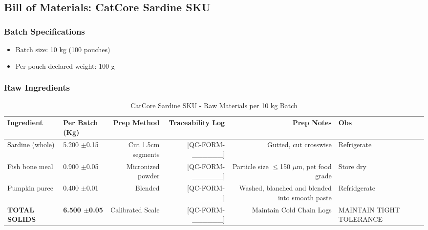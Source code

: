 \subsection*{Bill of Materials: CatCore Sardine SKU}
\label{bom:catcore_heart}

\subsubsection*{Batch Specifications}
\begin{itemize}
\item Batch size: 10 kg (100 pouches)
\item Per pouch declared weight: 100 g
\end{itemize}

\subsubsection*{Raw Ingredients}
\begin{table}[h]
\centering
\caption{CatCore Sardine SKU - Raw Materials per 10 kg Batch}
\begin{tabular}{@{}llrrrp{4cm}@{}}
\toprule
\textbf{Ingredient} & \textbf{Per Batch (Kg)} & \textbf{Prep Method}  & \textbf{Traceability Log} & \textbf{Prep Notes} & \textbf{Obs}\\
\midrule
Sardine (whole)     & 5.200 $\pm$0.15  & Cut 1.5cm segments     & [QC-FORM-\_\_\_\_\_\_] & Gutted, cut crosswise & Refrigerate\\
Fish bone meal      & 0.900 $\pm$0.05  & Micronized powder      & [QC-FORM-\_\_\_\_\_\_] & Particle size $\le$150 $\mu$m, pet food grade & Store dry\\
Pumpkin puree       & 0.400 $\pm$0.01  & Blended                & [QC-FORM-\_\_\_\_\_\_] & Washed, blanched and blended into smooth paste & Refridgerate \\
\midrule
\textbf{TOTAL SOLIDS} & \textbf{6.500 $\pm$0.05} & Calibrated Scale & [QC-FORM-\_\_\_\_\_\_] & Maintain Cold Chain Logs & MAINTAIN TIGHT TOLERANCE\\
\bottomrule
\end{tabular}
\end{table}

